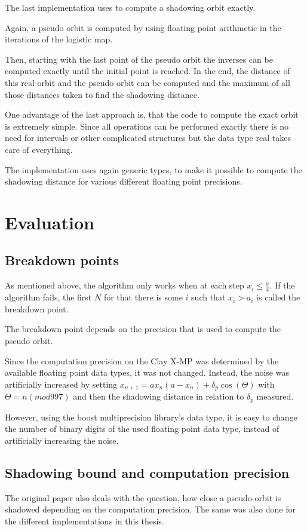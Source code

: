   The last implementation uses \irram to compute a shadowing orbit exactly.

  Again, a pseudo orbit is computed by using floating point arithmetic in the
  iterations of the logistic map.

  Then, starting with the last point of the pseudo orbit the inverses can be computed exactly until the initial point is reached.
  In the end, the distance of this real orbit and the pseudo orbit can be computed and the maximum of all those distances taken to find the shadowing distance.

  One advantage of the last approach is, that the \irram code to compute the exact orbit is extremely simple. 
  Since all operations can be performed exactly there is no need for intervals
  or other complicated structures but the data type real takes care of
  everything.

  The implementation uses again generic types, to make it possible to compute
  the shadowing distance for various different floating point precisions.
\section{Evaluation}
  \subsection{Breakdown points}
  As mentioned above, the algorithm only works when at each step $x_i \leq
  \frac{a}{4}.$ 
  If the algorithm fails, the first $N$ for that there is some $i$ such that
  $x_i > a_i$ is called the breakdown point.

  The breakdown point depends on the precision that is used to compute the pseudo orbit. 

  Since the computation precision on the Clay X-MP was determined by the available floating point data types, it was not changed.
  Instead, the noise was artificially increased by setting $x_{n+1} =
  ax_n(a-x_n)+\delta_p \cos (\Theta)$ with $\Theta = n (mod 997)$ and then the
  shadowing distance in relation to $\delta_p$ measured.  
  
  However, using the boost multiprecision library's  data
  type, it is easy to change the number of binary digits of the used floating
  point data type, instead of artificially increasing the noise.

  

  \subsection{Shadowing bound and computation precision}
  The original paper also deals with the question, how close a pseudo-orbit is
  shadowed depending on the computation precision. The same was also done for
  the different implementations in this thesis.

